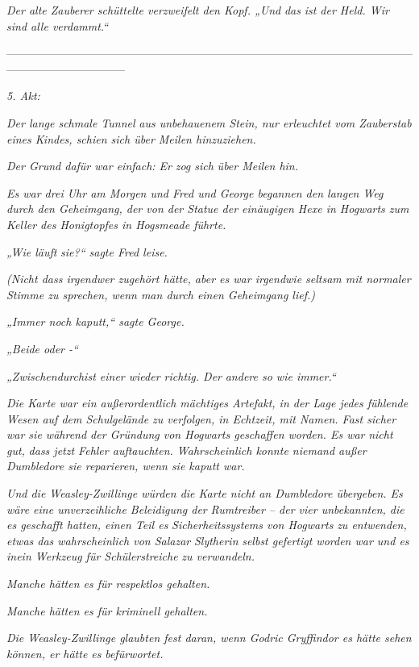 {\emph{Der alte Zauberer schüttelte verzweifelt den Kopf. „Und} \emph{\emph{das}} \emph{ist der Held. Wir sind alle verdammt.“}

--------------------------------------------------------------------------------------------------------------------------------------------

\emph{5. Akt:}

\emph{Der lange schmale Tunnel} \emph{aus unbehauenem Stein, nur erleuchtet vom Zauberstab eines Kindes, schien sich über Meilen hinzuziehen.}

\emph{Der Grund dafür war einfach: Er} \emph{\emph{zog sich}} \emph{über Meilen hin.}

\emph{Es war drei Uhr am Morgen und Fred und George begannen den langen Weg durch den Geheimgang, der von der Statue der einäugigen Hexe in Hogwarts zum Keller des Honigtopfes in Hogsmeade führte.}

\emph{„Wie läuft} \emph{sie?“ sagte Fred leise.}

\emph{(Nicht dass irgendwer zugehört hätte, aber es war irgendwie seltsam mit normaler Stimme zu sprechen, wenn man durch einen Geheimgang lief.)}

\emph{„Immer noch kaputt,“ sagte George.}

\emph{„Beide oder -“}

\emph{„Zwischendurchist einer wieder richtig. Der} \emph{andere so wie immer.“}

\emph{Die Karte war ein außerordentlich mächtiges Artefakt, in der Lage jedes fühlende Wesen auf dem Schulgelände zu verfolgen, in Echtzeit, mit Namen. Fast sicher war sie während der Gründung von Hogwarts geschaffen worden. Es war} \emph{\emph{nicht gut,}} \emph{dass jetzt Fehler auftauchten. Wahrscheinlich konnte niemand außer Dumbledore sie reparieren, wenn sie kaputt war.}

\emph{Und die Weasley-Zwillinge würden die Karte nicht an Dumbledore übergeben. Es wäre eine unverzeihliche Beleidigung der} \emph{Rumtreiber -- der vier unbekannten, die es geschafft hatten, einen Teil es} \emph{\emph{Sicherheitssystems von Hogwarts}} \emph{zu entwenden, etwas das wahrscheinlich von Salazar} \emph{Slytherin} \emph{selbst gefertigt worden war und es} \emph{in\emph{ein Werkzeug für Schülerstreiche}} \emph{zu verwandeln.}

\emph{Manche hätten es für respektlos gehalten.}

\emph{Manche hätten es für kriminell gehalten.}

\emph{Die Weasley-Zwillinge glaubten fest daran, wenn Godric Gryffindor es hätte sehen können, er hätte es} \emph{befürwortet.}

}
